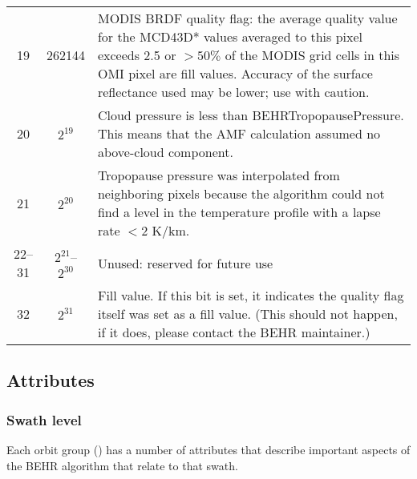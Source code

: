\documentclass[12pt]{article}
\begin{document}
\begin{center}
\begin{longtable}{ccY}
19 & 262144 & MODIS BRDF quality flag: the average quality value for the MCD43D* values averaged to this pixel exceeds 2.5 or $>50\%$ of the MODIS grid cells in this OMI pixel are fill values. Accuracy of the surface reflectance used may be lower; use with caution. \\
20 & $2^{19}$ & Cloud pressure is less than BEHRTropopausePressure. This means that the AMF calculation assumed no above-cloud component. \\
21 & $2^{20}$ & Tropopause pressure was interpolated from neighboring pixels because the algorithm could not find a level in the temperature profile with a lapse rate $< 2$ K/km. \\
22--31 & $2^{21}$--$2^{30}$ & Unused: reserved for future use \\ 
32 & $2^{31}$ & Fill value. If this bit is set, it indicates the quality flag itself was set as a fill value. (This should not happen, if it does, please contact the BEHR maintainer.) \\ \hline

\end{longtable}

\end{center}

\subsection{Attributes}
\subsubsection{Swath level}
	Each orbit group () has a number of attributes that describe important aspects of the BEHR algorithm that relate to that swath.
	
\end{document}
